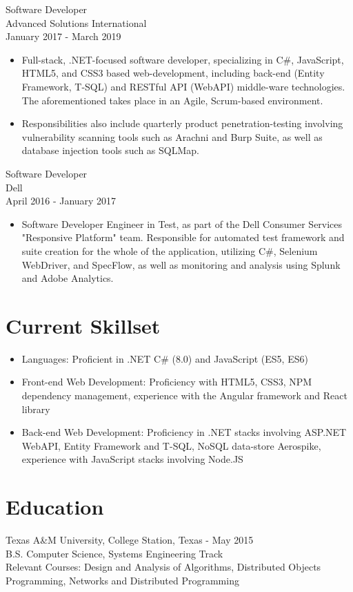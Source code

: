 \documentclass[11pt]{res} %
\begin{document}
\begin{resume}
Software Developer \\
Advanced Solutions International \\
January 2017 - March 2019
\vspace{0.2in}
   \begin{itemize} \itemsep -2pt  %
   \item Full-stack, .NET-focused software developer, specializing in C\#, JavaScript, HTML5, and CSS3 based web-development, including back-end (Entity Framework, T-SQL) and RESTful API (WebAPI) middle-ware technologies. The aforementioned takes place in an Agile, Scrum-based environment.
\newline
    \item Responsibilities also include quarterly product penetration-testing involving vulnerability scanning tools such as Arachni and Burp Suite, as well as database injection tools such as SQLMap.
 \end{itemize}

 Software Developer \\
Dell \\
April 2016 - January 2017
\vspace{0.2in}
   \begin{itemize} \itemsep -2pt  %
   \item Software Developer Engineer in Test, as part of the Dell Consumer Services "Responsive Platform" team. Responsible for automated test framework and suite creation for the whole of the application, utilizing C\#, Selenium WebDriver, and SpecFlow, as well as monitoring and analysis using Splunk and Adobe Analytics.
 \end{itemize}

\section{Current Skillset} 
 
   \begin{itemize} \itemsep -2pt  %
   \item Languages: Proficient in .NET C\# (8.0) and JavaScript (ES5, ES6)
\\
   \item Front-end Web Development: Proficiency with HTML5, CSS3, NPM dependency management, experience with the Angular framework and React library
\\
    \item Back-end Web Development: Proficiency in .NET stacks involving ASP.NET WebAPI, Entity Framework and T-SQL, NoSQL data-store Aerospike, experience with JavaScript stacks involving Node.JS
 \end{itemize}
 
\section{Education} 
 \noindent Texas A\&M University, College Station, Texas - May 2015 \\
B.S. Computer Science, Systems Engineering Track \\
Relevant Courses: Design and Analysis of Algorithms, Distributed Objects Programming, Networks and Distributed Programming

\end{resume}
\end{document}
